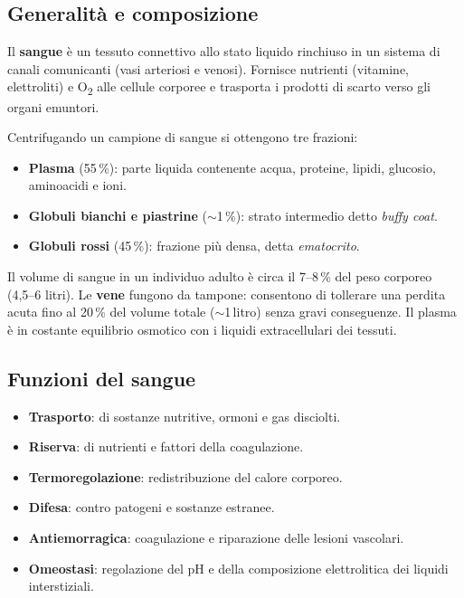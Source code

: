 \subsection{Generalità e composizione}

Il \textbf{sangue} è un tessuto connettivo allo stato liquido rinchiuso in un
sistema di canali comunicanti (vasi arteriosi e venosi). Fornisce nutrienti
(vitamine, elettroliti) e O\textsubscript{2} alle cellule corporee e trasporta
i prodotti di scarto verso gli organi emuntori.

Centrifugando un campione di sangue si ottengono tre frazioni:

\begin{itemize}
  \item \textbf{Plasma} (55\,\%): parte liquida contenente acqua, proteine,
    lipidi, glucosio, aminoacidi e ioni.
  \item \textbf{Globuli bianchi e piastrine} ($\sim$1\,\%): strato intermedio
    detto \textit{buffy coat}.
  \item \textbf{Globuli rossi} (45\,\%): frazione più densa, detta
    \textit{ematocrito}.
\end{itemize}

Il volume di sangue in un individuo adulto è circa il 7--8\,\% del peso
corporeo (4,5--6 litri). Le \textbf{vene} fungono da tampone: consentono di
tollerare una perdita acuta fino al 20\,\% del volume totale
($\sim$1\,litro) senza gravi conseguenze. Il plasma è in costante equilibrio
osmotico con i liquidi extracellulari dei tessuti.

\subsection{Funzioni del sangue}

\begin{itemize}
  \item \textbf{Trasporto}: di sostanze nutritive, ormoni e gas disciolti.
  \item \textbf{Riserva}: di nutrienti e fattori della coagulazione.
  \item \textbf{Termoregolazione}: redistribuzione del calore corporeo.
  \item \textbf{Difesa}: contro patogeni e sostanze estranee.
  \item \textbf{Antiemorragica}: coagulazione e riparazione delle lesioni vascolari.
  \item \textbf{Omeostasi}: regolazione del pH e della composizione
    elettrolitica dei liquidi interstiziali.
\end{itemize}

